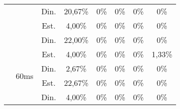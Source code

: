 \begin{center}
\begin{longtable}{|c|c|c|ccccc|}
 &  & Din. & 20,67\% &0\% &0\% &0\% &0\% \\
 &  & Est. & 4,00\% &0\% &0\% &0\% &0\% \\
 &  & Din. & 22,00\% &0\% &0\% &0\% &0\% \\ \cline{2-8} 
 & \multirow{4}{*}{60ms} & Est. & 4,00\% &0\% &0\% &0\% & 1,33\% \\
 &  & Din. & 2,67\% &0\% &0\% &0\% &0\% \\
 &  & Est. & 22,67\% &0\% &0\% &0\% &0\% \\
 &  & Din. & 4,00\% &0\% &0\% &0\% &0\% \\ \hline
\end{longtable}
\end{center}

